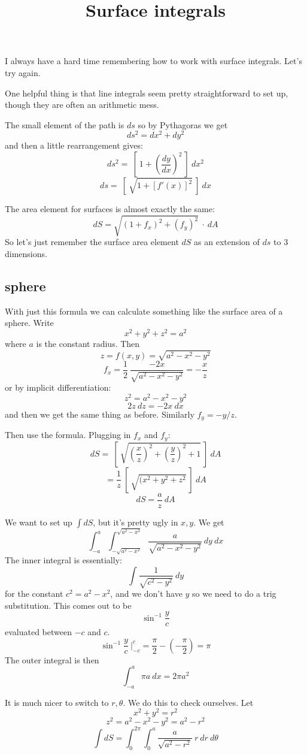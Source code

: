 \documentclass[11pt, oneside]{article}   	%
\title{Surface integrals}
\date{}							%
\begin{document}
\maketitle
\Large
I always have a hard time remembering how to work with surface integrals.  Let's try again.  

One helpful thing is that line integrals seem pretty straightforward to set up, though they are often an arithmetic mess.

The small element of the path is $ds$ so by Pythagoras we get 
\[ ds^2 = dx^2 + dy^2 \] 
and then a little rearrangement gives:
\[ ds^2 = \ [ \ 1 + (\frac{dy}{dx})^2 \ ] \ dx^2 \] 
\[ ds = \ [ \ \sqrt{1 + [f'(x)]^2} \ ] \ dx \]

The area element for surfaces is almost exactly the same:
\[ dS =  \sqrt{(1 + f_x)^2 + (f_y)^2} \  \cdot \ dA \]
So let's just remember the surface area element $dS$ as an extension of $ds$ to 3 dimensions.

\subsection*{sphere}
With just this formula we can calculate something like the surface area of a sphere.  Write
\[ x^2 + y^2 + z^2 = a^2 \]
where $a$ is the constant radius.  Then
\[ z = f(x,y) = \sqrt{a^2 - x^2 - y^2} \]
\[ f_x = \frac{1}{2} \ \frac{-2x}{\sqrt{a^2 - x^2 - y^2}} = -\frac{x}{z} \]
or by implicit differentiation:
\[ z^2 = a^2 - x^2 - y^2 \]
\[ 2 z \ dz = - 2 x \ dx \]
and then we get the same thing as before.  Similarly $f_y = -y/z$.

Then use the formula.  Plugging in $f_x$ and $f_y$:
\[ dS = \ [ \ \sqrt{(\frac{x}{z})^2 + (\frac{y}{z})^2 + 1} \  ] \ dA \]
\[ = \frac{1}{z}  \ [ \ \sqrt{(x^2 + y^2 + z^2} \  ] \ dA \]
\[ dS = \frac{a}{z} \ dA \]

We want to set up $\int dS$, but it's pretty ugly in $x,y$.  We get
\[ \int_{-a}^a \int_{-\sqrt{a^2-x^2}}^{\sqrt{a^2-x^2}} \frac{a}{\sqrt{a^2 - x^2 -y^2}} \ dy \ dx \]
The inner integral is essentially:
\[ \int \frac{1}{\sqrt{c^2 -y^2}} \ dy \]
for the constant $c^2 = a^2 - x^2$, and we don't have $y$ so we need to do a trig substitution.  This comes out to be
\[ \sin^{-1} \frac{y}{c} \]
evaluated between $-c$ and $c$.  
\[ \sin^{-1} \frac{y}{c} \  \bigg |_{-c}^c = \frac{\pi}{2} - (- \frac{\pi}{2}) = \pi  \]
The outer integral is then
\[ \int_{-a}^a \pi a \ dx = 2 \pi a^2 \]

It is much nicer to switch to $r,\theta$.  We do this to check ourselves. Let
\[ x^2 + y^2 = r^2 \]
\[ z^2 = a^2 - x^2 - y^2 = a^2 - r^2 \]
\[ \int dS = \int_0^{2 \pi} \int_0^a  \frac{a}{\sqrt{a^2 - r^2}} \ r \ dr \ d \theta \]
\end{document}
